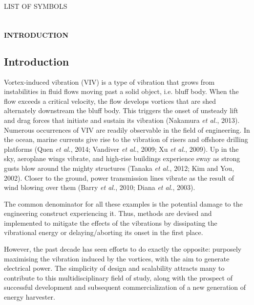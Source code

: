 \documentclass[]{article}
\begin{document}
\protect\hypertarget{_Toc41048790}{}{}LIST OF SYMBOLS

\section{\texorpdfstring{\protect\hypertarget{_Toc461037239}{}{\protect\hypertarget{_Toc461037422}{}{\protect\hypertarget{_Toc41048791}{}{}}}}{}}\label{section}

\textbf{INTRODUCTION}

\hypertarget{introduction}{\subsection{Introduction}\label{introduction}}

Vortex-induced vibration (VIV) is a type of vibration that grows from
instabilities in fluid flows moving past a solid object, i.e. bluff
body. When the flow exceeds a critical velocity, the flow develops
vortices that are shed alternately downstream the bluff body. This
triggers the onset of unsteady lift and drag forces that initiate and
sustain its vibration (Nakamura \emph{et al.}, 2013). Numerous
occurrences of VIV are readily observable in the field of engineering.
In the ocean, marine currents give rise to the vibration of risers and
offshore drilling platforms (Quen \emph{et al.}, 2014; Vandiver \emph{et
al.}, 2009; Xu \emph{et al.}, 2009). Up in the sky, aeroplane wings
vibrate, and high-rise buildings experience sway as strong gusts blow
around the mighty structures (Tanaka \emph{et al.}, 2012; Kim and You,
2002). Closer to the ground, power transmission lines vibrate as the
result of wind blowing over them (Barry \emph{et al.}, 2010; Diana
\emph{et al.}, 2003).

The common denominator for all these examples is the potential damage to
the engineering construct experiencing it. Thus, methods are devised and
implemented to mitigate the effects of the vibrations by dissipating the
vibrational energy or delaying/aborting its onset in the first place.

However, the past decade has seen efforts to do exactly the opposite:
purposely maximising the vibration induced by the vortices, with the aim
to generate electrical power. The simplicity of design and scalability
attracts many to contribute to this multidisciplinary field of study,
along with the prospect of successful development and subsequent
commercialization of a new generation of energy harvester.
\end{document}
